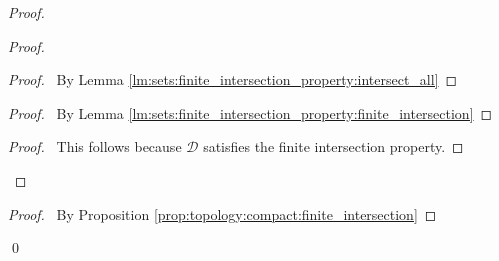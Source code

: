 \begin{proof}
\begin{proof}
\begin{proof}
    \pf\ By Lemma \ref{lm:sets:finite_intersection_property:intersect_all}
  \end{proof}
  \begin{proof}
    \pf\ By Lemma \ref{lm:sets:finite_intersection_property:finite_intersection}
  \end{proof}
  \begin{proof}
    \pf\ This follows because $\mathcal{D}$ satisfies the finite intersection property.
  \end{proof}
\end{proof}
\qedstep
\begin{proof}
  \pf\ By Proposition \ref{prop:topology:compact:finite_intersection}
\end{proof}
\qed
\end{proof}

